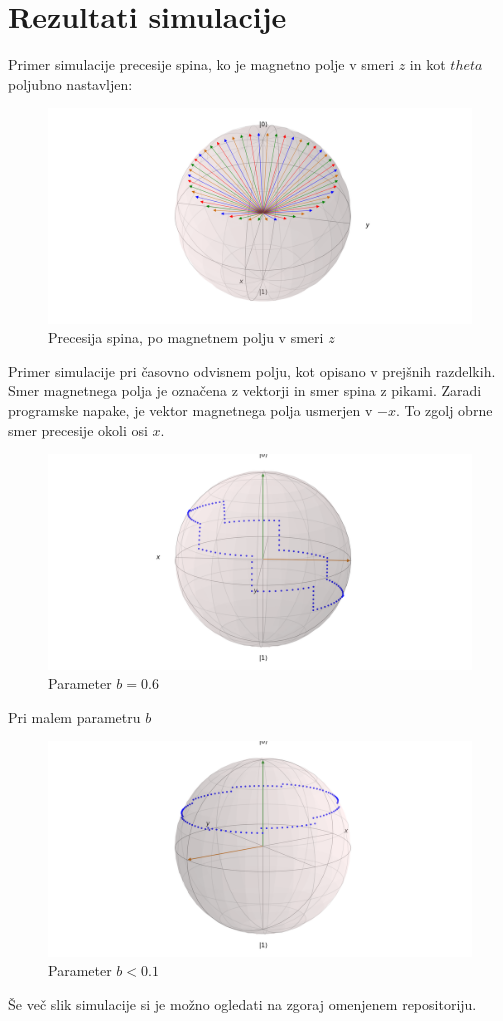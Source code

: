 \documentclass[12pt, a4paper]{article}
\begin{document}
\section{Rezultati simulacije}
Primer simulacije precesije spina, ko je magnetno polje v smeri $z$ in kot $theta$ poljubno nastavljen:
\begin{figure}[H]
  \includegraphics[width=350pt]{slike/precesija_po_osi_z}
  \caption{Precesija spina, po magnetnem polju v smeri $z$}
  \label{fig:boat1}
\end{figure}
Primer simulacije pri časovno odvisnem polju, kot opisano v prejšnih razdelkih. Smer magnetnega polja je označena z vektorji in smer spina z pikami. Zaradi programske napake, je vektor magnetnega polja usmerjen v $-x$. To zgolj obrne smer precesije okoli osi $x$.
\begin{figure}[H]
	\includegraphics[width=350pt]{slike/b=06.png}
	\caption{Parameter $b = 0.6$ }
	\label{fig:boat1}
\end{figure}
Pri malem parametru $b$
\begin{figure}[H]
	\includegraphics[width=400pt]{slike/precesija_v_cas}
	\caption{Parameter $b < 0.1$ }
	\label{fig:boat1}
  \end{figure}
Še več slik simulacije si je možno ogledati na zgoraj omenjenem repositoriju.
\end{document}

